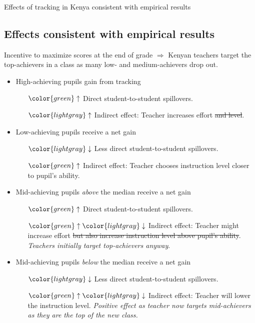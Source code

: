 \documentclass[9pt]{beamer}
\numberwithin{equation}{section}
\begin{document}
\begin{frame}{Effects of tracking in Kenya consistent with empirical results}
  \subsection{Effects consistent with empirical results}
  Incentive to maximize scores at the end of  grade $\Rightarrow$ Kenyan teachers target the top-achievers in a class as many low- and medium-achievers drop out.
  \begin{itemize}
    \item High-achieving pupils gain from tracking
    \begin{itemize}
      \item[$\color{green} \uparrow$] Direct student-to-student spillovers.
      \item[$\color{lightgray} \uparrow$] Indirect effect: Teacher increases effort \sout{and level}.
    \end{itemize}
    \item Low-achieving pupils receive a net gain
    \begin{itemize}
      \item[$\color{lightgray} \downarrow$] Less direct student-to-student spillovers.
      \item[$\color{green} \uparrow$] Indirect effect: Teacher chooses instruction level closer to pupil's ability.
    \end{itemize}
    \item Mid-achieving pupils \textit{above} the median receive a net gain
    \begin{itemize}
      \item[$\color{green}\uparrow$] Direct student-to-student spillovers.
      \item[$\color{green}\uparrow \color{lightgray}\downarrow$] Indirect effect: Teacher might increase effort \sout{but also increase instruction level above pupil's ability}. \textit{Teachers initially target top-achievers anyway}.
    \end{itemize}
    \item Mid-achieving pupils \textit{below} the median receive a net gain
    \begin{itemize}
      \item[$\color{lightgray} \downarrow$] Less direct student-to-student spillovers.
      \item[$\color{green}\uparrow \color{lightgray} \downarrow$] Indirect effect: Teacher will lower the instruction level. \textit{Positive effect as teacher now targets mid-achievers as they are the top of the new class.}
    \end{itemize}
  \end{itemize}
\end{frame}
\end{document}
